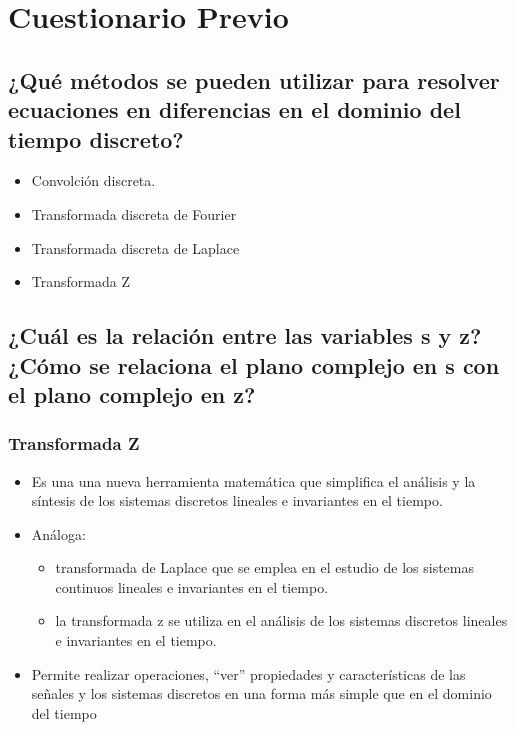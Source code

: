 \section*{Cuestionario Previo}

\noindent \justifying


\subsection{¿Qué métodos se pueden utilizar para resolver ecuaciones en diferencias en el dominio del tiempo discreto?} 

\begin{itemize}
	\item Convolción discreta.
	\item Transformada discreta de Fourier
	\item Transformada discreta de Laplace
	\item Transformada Z
\end{itemize} 


\subsection{¿Cuál es la relación entre las variables s y z? ¿Cómo se relaciona el plano complejo en s con el plano complejo en z?}


\subsubsection{Transformada Z}

\begin{itemize}
	\item Es una una nueva herramienta matemática que simplifica el análisis y la síntesis de los sistemas discretos lineales e invariantes en el tiempo.
	\item Análoga: \begin{itemize}
		\item  transformada de Laplace que se emplea en el estudio de los sistemas continuos lineales
		e invariantes en el tiempo.
		\item la transformada z se utiliza en el análisis de los sistemas discretos lineales e invariantes en el tiempo.
	\end{itemize}
	\item Permite realizar operaciones, “ver” propiedades y características de
	las señales y los sistemas discretos en una forma más simple que en el dominio del tiempo
\end{itemize}

